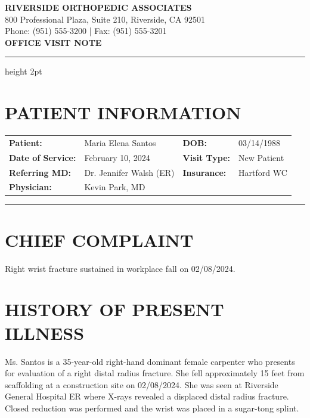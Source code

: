 \documentclass[11pt]{article}
\begin{document}
\begin{center}
{\Large\bfseries\color{orthogreen} RIVERSIDE ORTHOPEDIC ASSOCIATES}\\[0.3em]
{\small 800 Professional Plaza, Suite 210, Riverside, CA 92501}\\
{\small Phone: (951) 555-3200 | Fax: (951) 555-3201}\\[1em]
{\LARGE\bfseries OFFICE VISIT NOTE}
\end{center}

\vspace{0.5em}
\hrule height 2pt
\vspace{1em}

\section*{PATIENT INFORMATION}

\begin{tabular}{@{}p{3.5cm}p{5cm}p{3cm}p{4cm}@{}}
\textbf{Patient:} & Maria Elena Santos & \textbf{DOB:} & 03/14/1988 \\
\textbf{Date of Service:} & February 10, 2024 & \textbf{Visit Type:} & New Patient \\
\textbf{Referring MD:} & Dr. Jennifer Walsh (ER) & \textbf{Insurance:} & Hartford WC \\
\textbf{Physician:} & Kevin Park, MD & & \\
\end{tabular}

\vspace{1em}
\hrule
\vspace{1em}

\section*{CHIEF COMPLAINT}

Right wrist fracture sustained in workplace fall on 02/08/2024.

\section*{HISTORY OF PRESENT ILLNESS}

Ms. Santos is a 35-year-old right-hand dominant female carpenter who presents for evaluation of a right distal radius fracture. She fell approximately 15 feet from scaffolding at a construction site on 02/08/2024. She was seen at Riverside General Hospital ER where X-rays revealed a displaced distal radius fracture. Closed reduction was performed and the wrist was placed in a sugar-tong splint.
\end{document}

